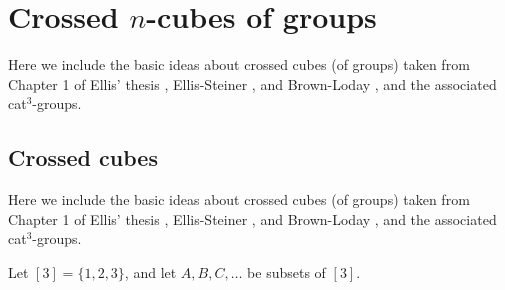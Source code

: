 

\section{Crossed $n$-cubes of groups}

\noindent
Here we include the basic ideas about crossed cubes (of groups)
taken from Chapter 1 of Ellis' thesis \cite{ellis-thesis},
Ellis-Steiner \cite{ell:st}, and Brown-Loday \cite{brow:lod}, 
and the associated cat$^3$-groups.

\subsection{Crossed cubes}\label{sect:xcube}

\noindent {} 
Here we include the basic ideas about crossed cubes (of groups)
taken from Chapter 1 of Ellis' thesis \cite{ellis-thesis},
Ellis-Steiner \cite{ell:st}, and Brown-Loday \cite{brow:lod}, 
and the associated cat$^3$-groups.

\noindent\bigskip
Let $[3] = \{1,2,3\}$, and let $A,B,C,\ldots$ be subsets of $[3]$.

